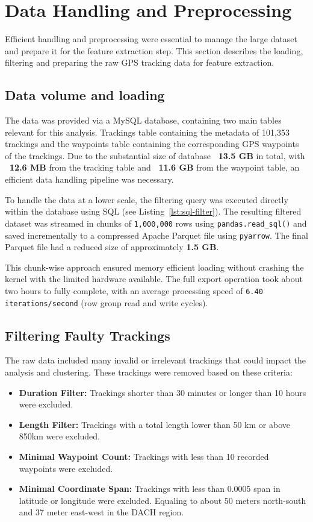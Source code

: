 \documentclass[a4paper,12pt,twoside]{scrreprt}
\begin{document}
\section{Data Handling and Preprocessing}
Efficient handling and preprocessing were essential to manage the large dataset
and prepare it for the feature extraction step.
This section describes the loading, filtering and preparing the raw GPS
tracking data for feature extraction.

\subsection{Data volume and loading}

The data was provided via a MySQL database, containing two main tables relevant
for this analysis.
Trackings table containing the metadata of 101,353 trackings and the waypoints
table containing the corresponding GPS waypoints of the trackings.
Due to the substantial size of database \textbf{~13.5 GB} in total, with
\textbf{~12.6 MB} from the tracking table and \textbf{~11.6 GB} from the
waypoint table,
an efficient data handling pipeline was necessary.

To handle the data at a lower scale, the filtering query was executed directly
within the database using SQL (see Listing~\ref{lst:sql-filter}). The resulting
filtered dataset was streamed in chunks of \texttt{1,000,000} rows using
\texttt{pandas.read\_sql()} and saved incrementally to a compressed Apache
Parquet file using \texttt{pyarrow}. The final Parquet file had a reduced size
of approximately \textbf{1.5 GB}.

This chunk-wise approach ensured memory efficient loading without crashing the
kernel with the limited hardware available.
The full export operation took about two hours to fully complete, with an
average processing speed of \texttt{6.40 iterations/second} (row group read and
write cycles).

\subsection{Filtering Faulty Trackings}
The raw data included many invalid or irrelevant trackings that could impact
the analysis and clustering. These trackings were removed based on these
criteria:

\begin{itemize}
  \item \textbf{Duration Filter:} Trackings shorter than 30 minutes or longer
        than 10 hours were excluded.
  \item \textbf{Length Filter:} Trackings with a total length lower than 50 km
        or above 850km were excluded.
  \item \textbf{Minimal Waypoint Count:} Trackings with less than 10 recorded
        waypoints were excluded.
  \item \textbf{Minimal Coordinate Span:} Trackings with less than 0.0005 span
        in latitude or longitude were excluded. Equaling to about 50 meters
        north-south
        and 37 meter east-west in the DACH region.
\end{itemize}
\end{document}
